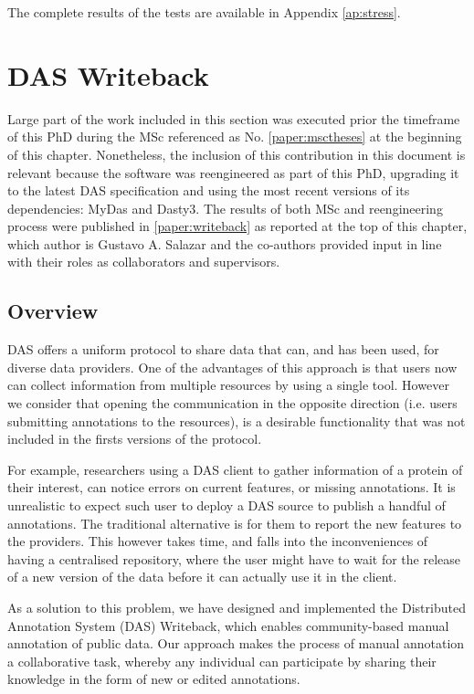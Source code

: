 The complete results of the tests are available in Appendix \ref{ap:stress}.










\section{DAS Writeback}\label{section:writeback}

Large part of the work included in this section was executed prior the timeframe of this PhD during the MSc referenced as No. \ref{paper:msctheses} at the beginning of this chapter. Nonetheless, the inclusion of this contribution in this document is relevant because the software was reengineered as part of this PhD, upgrading it to the latest DAS specification and using the most recent versions of its dependencies: MyDas and Dasty3. The results of both MSc and reengineering process were published in \ref{paper:writeback} as reported at the top of this chapter, which author is Gustavo A. Salazar and the co-authors provided input in line with their roles as collaborators and supervisors. 

\subsection{Overview}
DAS offers a uniform protocol to share data that can, and has been used, for diverse data providers. One of the advantages of this approach is that users now can collect information from multiple resources by using a single tool. However we consider that opening the communication in the opposite direction (i.e. users submitting annotations to the resources), is a desirable functionality that was not included in the firsts versions of the protocol.

For example, researchers using a DAS client to gather information of a protein of their interest, can notice errors on current features, or missing annotations. It is unrealistic to expect such user to deploy a DAS source to publish a handful of annotations. The traditional alternative is for them to report the new features to the providers. This however takes time, and falls into the inconveniences of having a centralised repository, where the user might have to wait for the release of a new version of the data before it can actually use it in the client.

As a solution to this problem, we have designed and implemented the Distributed Annotation System (DAS) Writeback, which enables community-based manual annotation of public data. Our approach makes the process of manual annotation a collaborative task, whereby any individual can participate by sharing their knowledge in the form of new or edited annotations.

